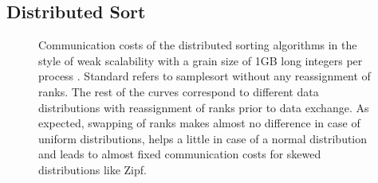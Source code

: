 \subsection{Distributed Sort}

\begin{figure}
\caption{\label{fig:comm} Communication costs of the distributed sorting algorithms in the style of weak scalability with a grain size of 1GB long integers per process	. Standard refers to samplesort without any reassignment of ranks. The rest of the curves correspond to different data distributions with reassignment of ranks prior to data exchange. As expected, swapping of ranks makes almost no difference in case of uniform distributions, helps a little in case of a normal distribution and leads to almost fixed communication costs for skewed distributions like Zipf.}
\end{figure}
